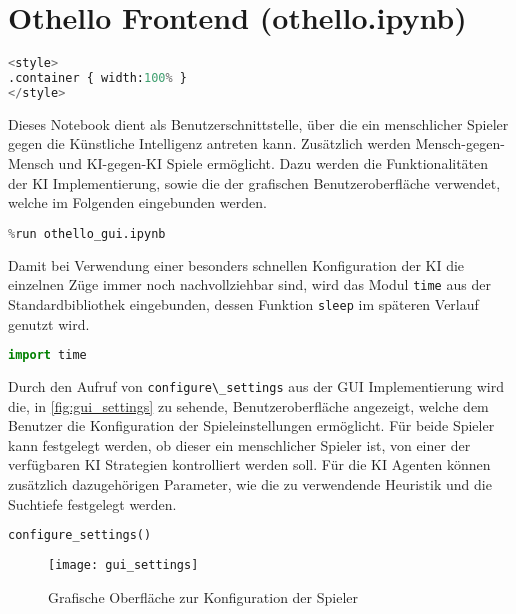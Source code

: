 \hypertarget{othello-frontend-othello.ipynb}{%
\section{Othello Frontend
(othello.ipynb)}\label{othello-frontend-othello.ipynb}}

\label{sec:frontend}

\begin{lstlisting}[language=Python]
%%HTML
<style>
.container { width:100% }
</style>
\end{lstlisting}

Dieses Notebook dient als Benutzerschnittstelle, über die ein
menschlicher Spieler gegen die Künstliche Intelligenz antreten kann.
Zusätzlich werden Mensch-gegen-Mensch und KI-gegen-KI Spiele ermöglicht.
Dazu werden die Funktionalitäten der KI Implementierung, sowie die der
grafischen Benutzeroberfläche verwendet, welche im Folgenden eingebunden
werden.

\begin{lstlisting}[language=Python]
%run othello_ai.ipynb
%run othello_gui.ipynb
\end{lstlisting}

Damit bei Verwendung einer besonders schnellen Konfiguration der KI die
einzelnen Züge immer noch nachvollziehbar sind, wird das Modul
\passthrough{\lstinline!time!} aus der Standardbibliothek eingebunden,
dessen Funktion \passthrough{\lstinline!sleep!} im späteren Verlauf
genutzt wird.

\begin{lstlisting}[language=Python]
import time
\end{lstlisting}

Durch den Aufruf von \passthrough{\lstinline!configure\_settings!} aus
der GUI Implementierung wird die, in \autoref{fig:gui_settings} zu
sehende, Benutzeroberfläche angezeigt, welche dem Benutzer die
Konfiguration der Spieleinstellungen ermöglicht. Für beide Spieler kann
festgelegt werden, ob dieser ein menschlicher Spieler ist, von einer der
verfügbaren KI Strategien kontrolliert werden soll. Für die KI Agenten
können zusätzlich dazugehörigen Parameter, wie die zu verwendende
Heuristik und die Suchtiefe festgelegt werden.

\begin{lstlisting}[language=Python]
configure_settings()
\end{lstlisting}

\begin{figure}[H]
    \centering
    \texttt{[image: gui\_settings]}
    \caption{Grafische Oberfläche zur Konfiguration der Spieler}
    \label{fig:gui_settings}
\end{figure}

